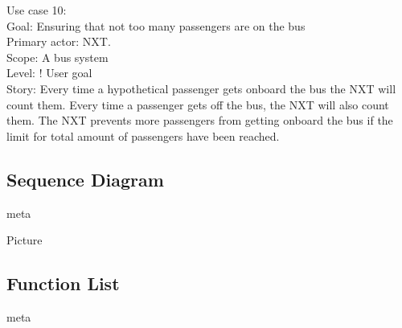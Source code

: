 Use case 10:\\
Goal: Ensuring that not too many passengers are on the bus\\
Primary actor: NXT.\\
Scope: A bus system\\
Level: ! User goal\\
Story: Every time a hypothetical passenger gets onboard the bus the NXT will count them. Every time a passenger gets off the bus, the NXT will also count them. The NXT prevents more passengers from getting onboard the bus if the limit for total amount of passengers have been reached. 

\subsection{Sequence Diagram}
meta

Picture

\subsection{Function List}
meta

